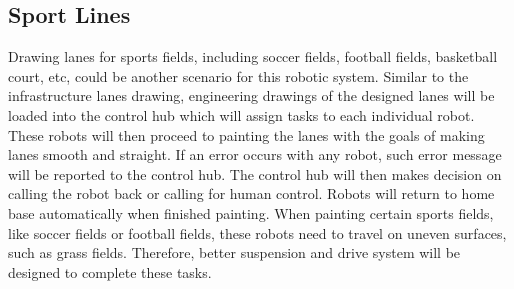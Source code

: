 \subsection{Sport Lines}
Drawing lanes for sports fields, including soccer fields, football fields, basketball court, etc, could be another scenario for this robotic system. Similar to the infrastructure lanes drawing, engineering drawings of the designed lanes will be loaded into the control hub which will assign tasks to each individual robot. These robots will then proceed to painting the lanes with the goals of making lanes smooth and straight. If an error occurs with any robot, such error message will be reported to the control hub. The control hub will then makes decision on calling the robot back or calling for human control. Robots will return to home base automatically when finished painting. When painting certain sports fields, like soccer fields or football fields, these robots need to travel on uneven surfaces, such as grass fields. Therefore, better suspension and drive system will be designed to complete these tasks.
